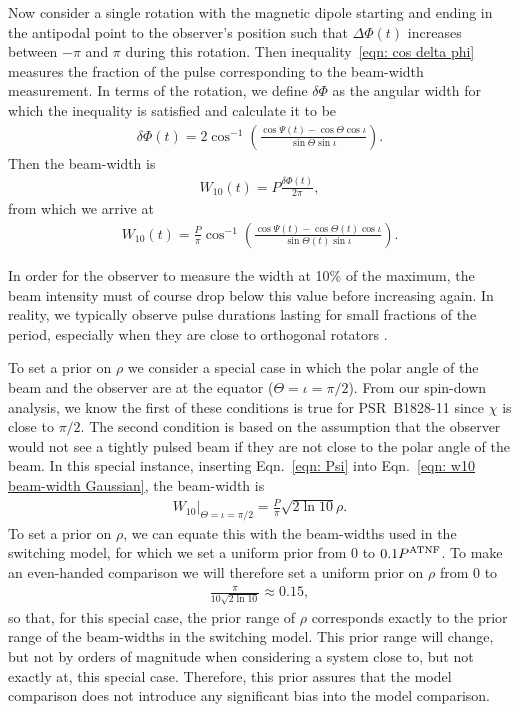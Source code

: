\documentclass[../full_thesis/full_thesis.tex]{subfiles}
\begin{document}
Now consider a single rotation with the magnetic dipole starting and ending in
the antipodal point to the observer's position such that $\Delta\Phi(t)$ increases
between $-\pi$ and $\pi$ during this rotation. Then inequality~\eqref{eqn: cos delta phi} measures the fraction of the pulse corresponding to
the beam-width measurement. In terms of the rotation, we define $\delta\Phi$ as
the angular width for which the inequality is satisfied and calculate it to be
\begin{align}
\delta\Phi(t) = 2\cos^{-1}\left(
\frac{\cos\Psi(t)-\cos\Theta\cos\iota}
    {\sin\Theta\sin\iota}
\right).
\end{align}
Then the beam-width is
\begin{align}
W_{10}(t) = P \frac{\delta\Phi(t)}{2\pi},
\end{align}
from which we arrive at
\begin{align}
W_{10}(t) = \frac{P}{\pi} \cos^{-1}\left(
\frac{\cos \Psi(t) - \cos\Theta(t)\cos\iota}{\sin\Theta(t)\sin\iota}
\right).
\label{eqn: w10 beam-width Gaussian}
\end{align}

In order for the observer to measure the width at 10\% of the maximum, the beam
intensity must of course drop below this value before increasing again. In
reality, we typically observe pulse durations lasting for small fractions of the
period, especially when they are close to orthogonal rotators \citep{Lyne1988}.

To set a prior on $\rho$ we consider a special case in which the polar angle of
the beam and the observer are at the equator ($\Theta=\iota=\pi/2$). From our
spin-down analysis, we know the first of these conditions is true for PSR~B1828-11
since $\chi$ is close to $\pi/2$. The second condition is based on the assumption
that the observer would not see a tightly pulsed beam if they are not close to the
polar angle of the beam. In this special instance, inserting
Eqn.~\eqref{eqn: Psi} into Eqn.~\eqref{eqn: w10 beam-width Gaussian}, the beam-width is
\begin{align}
W_{10} \bigg|_{\Theta=\iota=\pi/2} = \frac{P}{\pi}\sqrt{2\ln10} \rho.
\end{align}
To set a prior on $\rho$, we can equate this with the beam-widths used in the
switching model, for which we set a uniform prior from $0$ to $0.1P^{\mathrm{ATNF}}$.
To make an even-handed comparison we will therefore set a uniform prior on
$\rho$ from 0 to
\begin{align}
\frac{\pi}{10\sqrt{2\ln10}} \approx 0.15,
\label{eqn: rho prior}
\end{align}
so that, for this special case, the prior range of $\rho$ corresponds exactly
to the prior range of the beam-widths in the switching model.
This prior range will change, but not by orders of magnitude when
considering a system close to, but not exactly at, this special case. Therefore,
this prior assures that the model comparison does not introduce any significant
bias into the model comparison.
\end{document}
